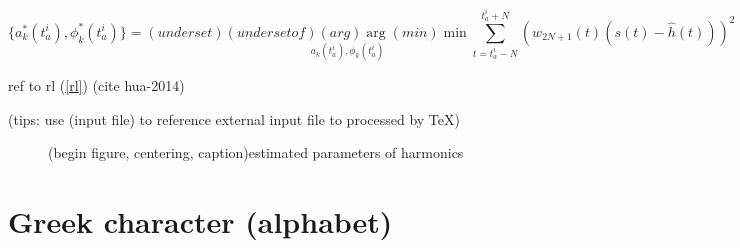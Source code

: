 \documentclass[11pt]{article}
\begin{document}
\begin{equation} \label{objective}
\{a_k^*(t^i_a), \phi_k^*(t^i_a)\} = (underset)\underset{a_k(t^i_a), \phi_k(t^i_a)}{(underset of)(arg)\arg(min)\min} \sum_{t = t^i_a - N}^{t^i_a + N} \left(w_{2N + 1}(t)(s(t) - \hat{h}(t))\right)^2
\end{equation}

ref to rl (\ref{rl}) (cite hua-2014) \cite{hua-2014}

(tips: use (input file) to reference external input file to processed by \TeX)
\begin{figure}
\centering

\caption{(begin figure, centering, caption)estimated parameters of harmonics}
\label{fig:harest}
\end{figure}

\section{Greek character (alphabet)}
\end{document}
